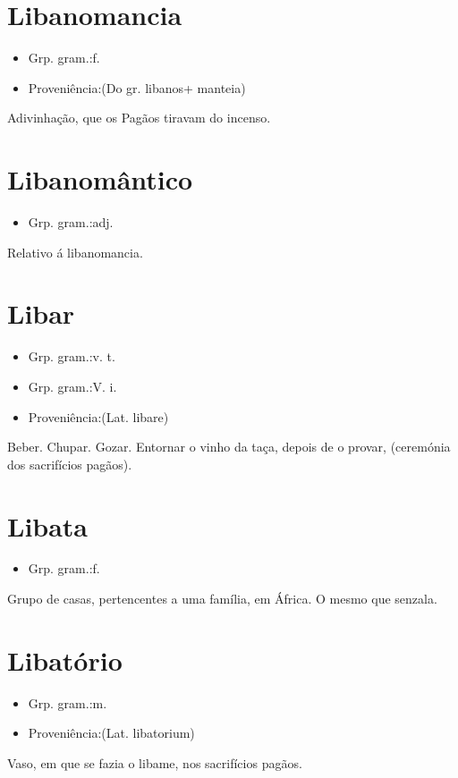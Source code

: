 \section{Libanomancia}
\begin{itemize}
\item {Grp. gram.:f.}
\end{itemize}
\begin{itemize}
\item {Proveniência:(Do gr. \textunderscore libanos\textunderscore  + \textunderscore manteia\textunderscore )}
\end{itemize}
Adivinhação, que os Pagãos tiravam do incenso.
\section{Libanomântico}
\begin{itemize}
\item {Grp. gram.:adj.}
\end{itemize}
Relativo á libanomancia.
\section{Libar}
\begin{itemize}
\item {Grp. gram.:v. t.}
\end{itemize}
\begin{itemize}
\item {Grp. gram.:V. i.}
\end{itemize}
\begin{itemize}
\item {Proveniência:(Lat. \textunderscore libare\textunderscore )}
\end{itemize}
Beber.
Chupar.
Gozar.
Entornar o vinho da taça, depois de o provar, (ceremónia dos sacrifícios pagãos).
\section{Libata}
\begin{itemize}
\item {Grp. gram.:f.}
\end{itemize}
Grupo de casas, pertencentes a uma família, em África.
O mesmo que \textunderscore senzala\textunderscore .
\section{Libatório}
\begin{itemize}
\item {Grp. gram.:m.}
\end{itemize}
\begin{itemize}
\item {Proveniência:(Lat. \textunderscore libatorium\textunderscore )}
\end{itemize}
Vaso, em que se fazia o libame, nos sacrifícios pagãos.
